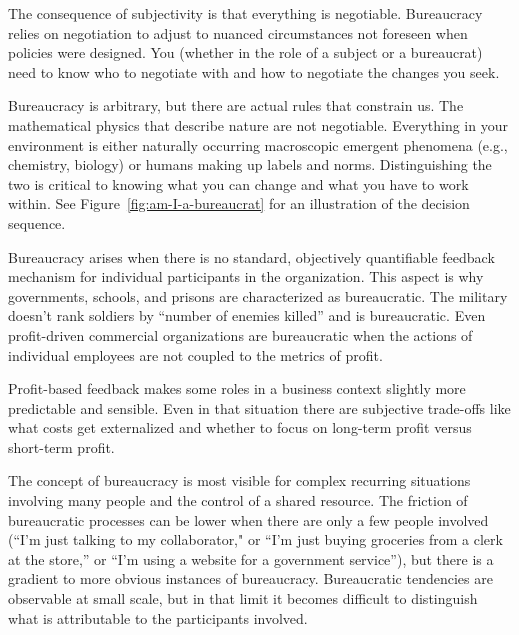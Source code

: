 The consequence of subjectivity is that everything is negotiable. Bureaucracy relies on negotiation to adjust to nuanced circumstances not foreseen when policies were designed.  You (whether in the role of a subject or a bureaucrat) need to know who to negotiate with and how to negotiate the changes you seek. 

Bureaucracy is arbitrary, but there are actual rules that constrain us. The mathematical physics that describe nature are not negotiable. Everything in your environment is either naturally occurring macroscopic emergent phenomena (e.g., chemistry, biology) or humans making up labels and norms. Distinguishing the two is critical to knowing what you can change and what you have to work within. See Figure~\ref{fig:am-I-a-bureaucrat}\iftoggle{haspagenumbers}{ on page~\pageref{fig:am-I-a-bureaucrat}}{} for an illustration of the decision sequence.

Bureaucracy arises when there is no standard, objectively quantifiable feedback mechanism for individual participants in the organization. This aspect is why governments, schools, and prisons are characterized as bureaucratic. 
The military doesn't rank soldiers by ``number of enemies killed'' and is bureaucratic. 
Even profit-driven commercial organizations are bureaucratic when the actions of individual employees are not coupled to the metrics of profit. %


Profit-based feedback makes some roles in a business context slightly more predictable and sensible. Even in that situation there are subjective trade-offs like what costs get externalized and whether to focus on long-term profit versus short-term profit. 

The concept of bureaucracy is most visible for complex recurring situations involving many people and the control of a shared resource. The friction of bureaucratic processes can be lower when there are only a few people involved (``I'm just talking to my collaborator," or ``I'm just buying groceries from a clerk at the store,'' or ``I'm using a website for a government service''), but there is a gradient to more obvious instances of bureaucracy. Bureaucratic tendencies are observable at small scale, but in that limit it becomes difficult to distinguish what is attributable to the participants involved.

